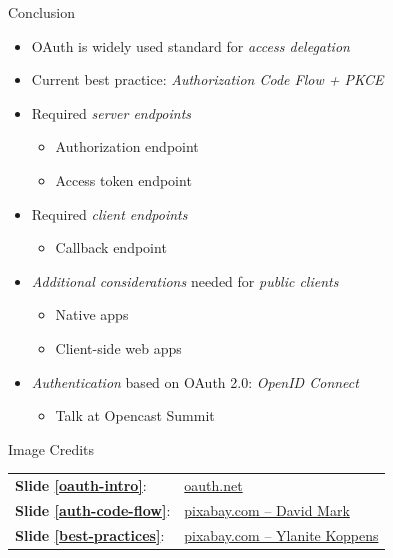 \documentclass[aspectratio=169]{beamer}
\begin{document}
\begin{frame}{Conclusion}
	\begin{itemize}
		\item OAuth is widely used standard for \emph{access delegation}
		\item Current best practice: \emph{Authorization Code Flow + PKCE}
		\pause
		\item Required \emph{server endpoints}
		\begin{itemize}
			\item Authorization endpoint
			\item Access token endpoint
		\end{itemize}
		\item Required \emph{client endpoints}
		\begin{itemize}
			\item Callback endpoint
		\end{itemize}
		\pause
		\item \emph{Additional considerations} needed for \emph{public clients}
		\begin{itemize}
			\item Native apps
			\item Client-side web apps
		\end{itemize}
		\pause
		\item \emph{Authentication} based on OAuth 2.0: \emph{OpenID Connect}
		\begin{itemize}
			\item Talk at Opencast Summit
		\end{itemize}
	\end{itemize}
\end{frame}

\makeref

\begin{frame}{Image Credits}
	\footnotesize
	\begin{tabular}{ll} 
		\textbf{Slide \ref{oauth-intro}}: & \href{http://wiki.oauth.net/w/page/12238520/Logo}{oauth.net} \\
		\textbf{Slide \ref{auth-code-flow}}: & \href{https://pixabay.com/images/id-1751463/}{pixabay.com -- David Mark} \\
		\textbf{Slide \ref{best-practices}}: & \href{https://pixabay.com/images/id-2946959/}{pixabay.com -- Ylanite Koppens}
	\end{tabular}
\end{frame}
\end{document}
